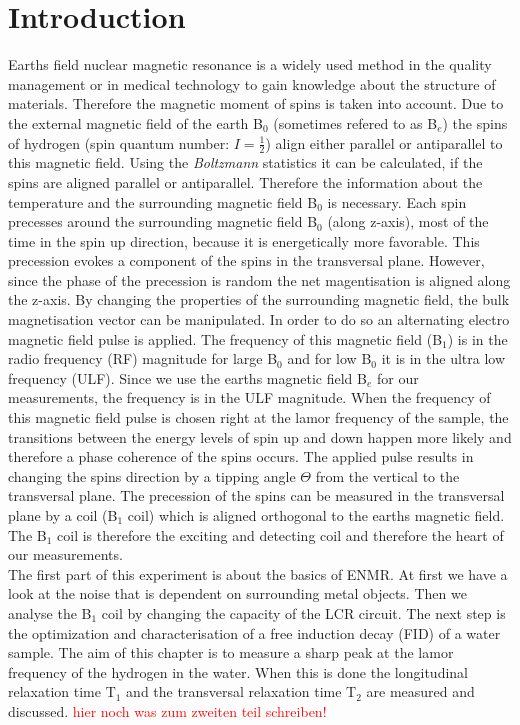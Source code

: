 \section{Introduction}
\label{sec:Introduction}
Earths field nuclear magnetic resonance is a widely used method in the quality management or in medical technology to gain knowledge about the structure of materials. Therefore the magnetic moment of spins is taken into account.\newline
Due to the external magnetic field of the earth B$_0$ (sometimes refered to as B$_e$) the spins of hydrogen (spin quantum number: $I=\frac{1}{2}$) align either parallel or antiparallel to this magnetic field. Using the \textit{Boltzmann} statistics it can be calculated, if the spins are aligned parallel or antiparallel. Therefore the information about the temperature and the surrounding magnetic field B$_0$ is necessary. Each spin precesses around the surrounding magnetic field B$_0$ (along z-axis), most of the time in the spin up direction, because it is energetically more favorable. This precession evokes a component of the spins in the transversal plane. However, since the phase of the precession is random the net magentisation is aligned along the z-axis. By changing the properties of the surrounding magnetic field, the bulk magnetisation vector can be manipulated. In order to do so an alternating electro magnetic field pulse is applied. The frequency of this magnetic field (B$_1$) is in the radio frequency (RF) magnitude for large B$_0$ and for low B$_0$ it is in the ultra low frequency (ULF). Since we use the earths magnetic field B$_e$ for our measurements, the frequency is in the ULF magnitude. When the frequency of this magnetic field pulse is chosen right at the lamor frequency of the sample, the transitions between the energy levels of spin up and down happen more likely and therefore a phase coherence of the spins occurs. The applied pulse results in changing the spins direction by a tipping angle $\Theta$ from the vertical to the transversal plane. The precession of the spins can be measured in the transversal plane by a coil (B$_1$ coil) which is aligned orthogonal to the earths magnetic field. The B$_1$ coil is therefore the exciting and detecting coil and therefore the heart of our measurements. \\
The first part of this experiment is about the basics of ENMR. At first we have a look at the noise that is dependent on surrounding metal objects. Then we analyse the B$_1$ coil by changing the capacity of the LCR circuit. The next step is the optimization and characterisation of a free induction decay (FID) of a water sample. The aim of this chapter is to measure a sharp peak at the lamor frequency of the hydrogen in the water. When this is done the longitudinal relaxation time T$_1$ and the transversal relaxation time T$_2$ are measured and discussed.
\textcolor{red}{hier noch was zum zweiten teil schreiben!}